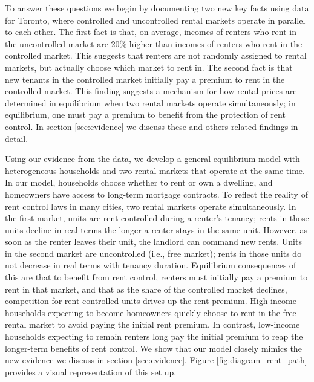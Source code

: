 \documentclass[parskip=full]{article}
\begin{document}
To answer these questions we begin by documenting two new key facts using data for Toronto, where controlled and uncontrolled rental markets operate in parallel to each other. The first fact is that, on average, incomes of renters who rent in the uncontrolled market are 20\% higher than incomes of renters who rent in the controlled market. This suggests that renters are not randomly assigned to rental markets, but actually choose which market to rent in. The second fact is that new tenants in the controlled market initially pay a premium to rent in the controlled market. This finding suggests a mechanism for how rental prices are determined in equilibrium when two rental markets operate simultaneously; in equilibrium, one must pay a premium to benefit from the protection of rent control. In section \ref{sec:evidence} we discuss these and others related findings in detail. 

Using our evidence from the data, we develop a general equilibrium model with heterogeneous households and two rental markets that operate at the same time. In our model, households choose whether to rent or own a dwelling, and homeowners have access to long-term mortgage contracts. To reflect the reality of rent control laws in many cities, two rental markets operate simultaneously. In the first market, units are rent-controlled during a renter's tenancy; rents in those units decline in real terms the longer a renter stays in the same unit. However, as soon as the renter leaves their unit, the landlord can command new rents. Units in the second market are uncontrolled (i.e., free market); rents in those units do not decrease in real terms with tenancy duration. Equilibrium consequences of this are that to benefit from rent control, renters must initially pay a premium to rent in that market, and that as the share of the controlled market declines, competition for rent-controlled units drives up the rent premium. High-income households expecting to become homeowners quickly choose to rent in the free rental market to avoid paying the initial rent premium. In contrast, low-income households expecting to remain renters long pay the initial premium to reap the longer-term benefits of rent control. We show that our model closely mimics the new evidence we discuss in section \ref{sec:evidence}. Figure \ref{fig:diagram_rent_path} provides a visual representation of this set up.
\end{document}
